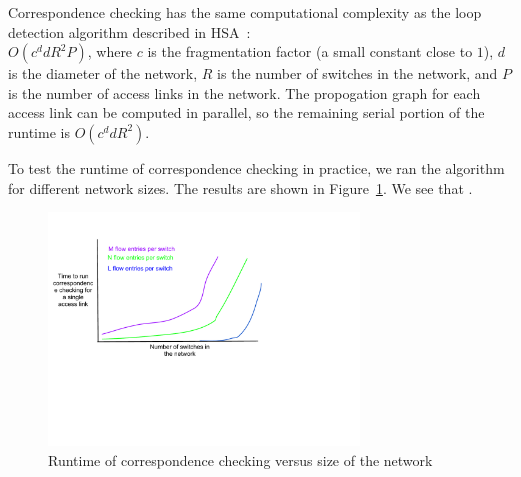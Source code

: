 
 Correspondence checking has
the same computational complexity as the loop detection algorithm described in
HSA~\cite{hsa}: \\
$O(c^{d}dR^{2}P)$, where $c$ is the fragmentation factor (a
small constant close to $1$), $d$ is the diameter of the network, $R$ is
the number of switches in the network, and $P$ is the number of access links
in the network. The propogation graph for each access link can be computed
in parallel, so the remaining serial portion of the runtime is $O(c^{d}dR^{2})$.

To test the runtime of correspondence checking in practice, we  ran the algorithm for different network sizes. The results are shown in
Figure~\ref{fig:hsa_runtime}. We see that .

\begin{figure}[t]
    \includegraphics[width=3.25in]{../graphs/mock_hsa_overhead.pdf}
    \caption[]{\label{fig:hsa_runtime} Runtime of correspondence checking
    versus size of the network}
\end{figure}

 

